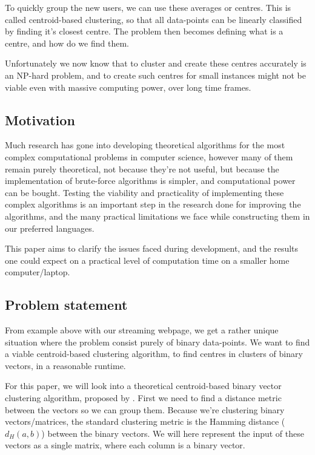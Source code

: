 \documentclass[a4paper]{article}
\begin{document}
To quickly group the new users, we can use these averages or centres. This is called centroid-based
clustering, so that all data-points can be linearly classified by finding it's closest centre.
The problem then becomes defining what is a centre, and how do we find them.

Unfortunately we now know that to cluster and create these centres accurately is an NP-hard problem,
and to create such centres for small instances might not be viable even with massive computing power,
over long time frames.

\subsection{Motivation}
Much research has gone into developing theoretical algorithms for the most complex computational
problems in computer science, however many of them remain purely theoretical, not because
they're not useful, but because the implementation of brute-force algorithms is simpler, and
computational power can be bought. Testing the viability and practicality of implementing
these complex algorithms is an important step in the research done for improving the
algorithms, and the many practical limitations we face while constructing them in our
preferred languages.

This paper aims to clarify the issues faced during development, and the results one could expect
on a practical level of computation time on a smaller home computer/laptop.

\subsection{Problem statement}
From example above with our streaming webpage, we get a rather unique situation where the problem consist
purely of binary data-points. We want to find a viable centroid-based clustering algorithm, to find
centres in clusters of binary vectors, in a reasonable runtime.

For this paper, we will look into a theoretical centroid-based binary vector clustering algorithm, proposed
by \cite{fomin_golovach_panolan_2020}. First we need to find a distance metric between the vectors so we
can group them. Because we're clustering binary vectors/matrices, the standard clustering metric is
the Hamming distance (\textit{$d_H(a, b)$}) between the binary vectors. We will here represent the input of these
vectors as a single matrix, where each column is a binary vector.
\end{document}
